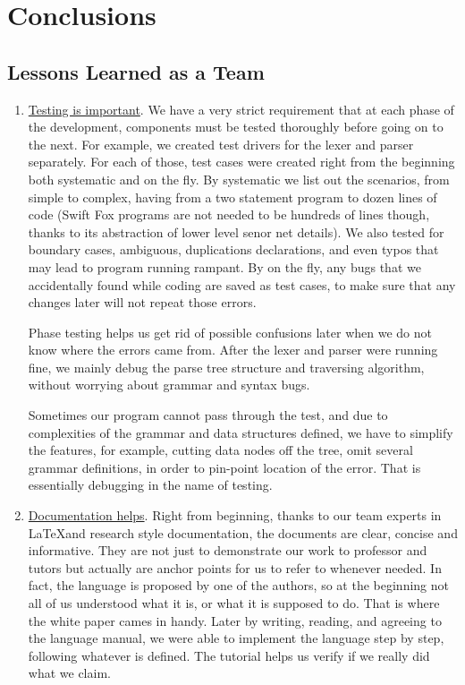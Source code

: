 \section{Conclusions}

\subsection{Lessons Learned as a Team}

\begin{enumerate}

\item \underline{Testing is important}. We have a very strict requirement
that at each phase of the development, components must be tested thoroughly
before going on to the next. For example, we created test drivers for the
lexer and parser separately. For each of those, test cases were created
right from the beginning both systematic and on the fly. By systematic we
list out the scenarios, from simple to complex, having from a two statement
program to dozen lines of code (Swift Fox programs are not needed to be
hundreds of lines though, thanks to its abstraction of lower level senor
net details). We also tested for boundary cases, ambiguous, duplications
declarations, and even typos that may lead to program running rampant. By
on the fly, any bugs that we accidentally found while coding are saved as
test cases, to make sure that any changes later will not repeat those
errors.

Phase testing helps us get rid of possible confusions later when we do not 
know where the errors came from. After the lexer and parser were running
fine, we mainly debug the parse tree structure and traversing algorithm,
without worrying about grammar and syntax bugs.

Sometimes our program cannot pass through the test, and due to complexities
of the grammar and data structures defined, we have to simplify the
features, for example, cutting data nodes off the tree, omit several
grammar definitions, in order to pin-point location of the error. That is
essentially debugging in the name of testing.

\item \underline{Documentation helps}. Right from beginning, thanks to our 
team experts in \LaTeX and research style documentation, the documents are 
clear, concise and informative. They are not just to demonstrate our work
to professor and tutors but actually are anchor points for us to refer to
whenever needed. In fact, the language is proposed by one of the authors,
so at the beginning not all of us understood what it is, or what it is
supposed to do. That is where the white paper cames in handy. Later by
writing, reading, and agreeing to the language manual, we were able to
implement the language step by step, following whatever is defined. The
tutorial helps us verify if we really did what we claim.


\end{enumerate}
